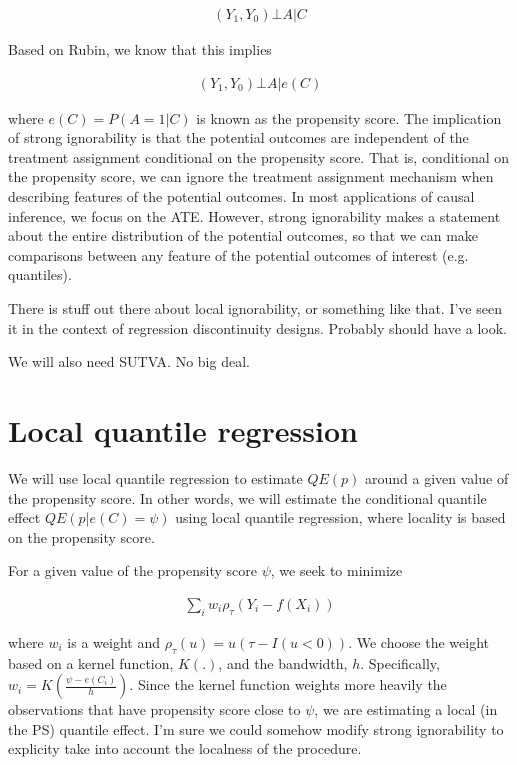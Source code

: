 \documentclass{article}\usepackage[]{graphicx}\usepackage[]{color}
\begin{document}
\begin{align*}
  (Y_1,Y_0) \bot A | C
\end{align*}

\noindent Based on Rubin, we know that this implies 

\begin{align*}
  (Y_1,Y_0) \bot A | e(C)
\end{align*}

\noindent where $e(C)=P(A=1|C)$ is known as the propensity score. The implication of strong ignorability is that the potential outcomes are independent of the treatment assignment conditional on the propensity score. That is, conditional on the propensity score, we can ignore the treatment assignment mechanism when describing features of the potential outcomes. In most applications of causal inference, we focus on the ATE. However, strong ignorability makes a statement about the entire distribution of the potential outcomes, so that we can make comparisons between any feature of the potential outcomes of interest (e.g. quantiles). 

There is stuff out there about local ignorability, or something like that. I've seen it in the context of regression discontinuity designs. Probably should have a look. 

We will also need SUTVA. No big deal. 

\section{Local quantile regression}

We will use local quantile regression to estimate $QE(p)$ around a given value of the propensity score. In other words, we will estimate the conditional quantile effect $QE(p|e(C)=\psi)$ using local quantile regression, where locality is based on the propensity score.

For a given value of the propensity score $\psi$, we seek to minimize

\begin{align*}
  \sum_i w_i \rho_\tau( Y_i - f(X_i))
\end{align*}

where $w_i$ is a weight and $\rho_\tau(u)=u(\tau-I(u<0))$. We choose the weight based on a kernel function, $K(.)$, and the bandwidth, $h$. Specifically, $w_i=K( \frac{\psi-e(C_i)}{h})$. Since the kernel function weights more heavily the observations that have propensity score close to $\psi$, we are estimating a local (in the PS) quantile effect. I'm sure we could somehow modify strong ignorability to explicity take into account the localness of the procedure. 
\end{document}
